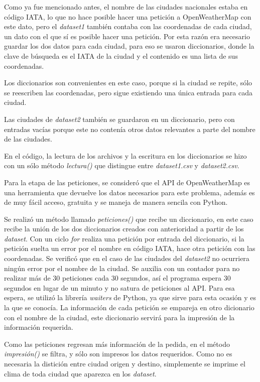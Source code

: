 \documentclass[]{article}
\begin{document}
Como ya fue mencionado antes, el nombre de las ciudades nacionales estaba 
en código IATA, lo que no hace posible hacer una petición a OpenWeatherMap 
con este dato, pero el \emph{dataset1} también contaba con las coordenadas 
de cada ciudad, un dato con el que sí es posible hacer una petición. Por esta 
razón era necesario guardar los dos datos para cada ciudad, para eso se 
usaron diccionarios, donde la clave de búsqueda es el IATA de la ciudad y el 
contenido es una lista de sus coordenadas.

Los diccionarios son convenientes en este caso, porque si la ciudad se repite, 
sólo se reescriben las coordenadas, pero sigue existiendo una única entrada 
para cada ciudad.

Las ciudades de \emph{dataset2} también se guardaron en un diccionario, 
pero con entradas vacías porque este no contenía otros datos relevantes a 
parte del nombre de las ciudades.

En el código, la lectura de los archivos y la escritura en los diccionarios se 
hizo con un sólo método \emph{lectura()} que distingue entre
\emph{dataset1.csv} y \emph{dataset2.csv}.

Para la etapa de las peticiones, se consideró que el API de OpenWeatherMap 
es una herramienta que devuelve los datos necesarios para este problema, 
además es de muy fácil acceso, gratuita y se maneja de manera sencila con 
Python.

Se realizó un método llamado \emph{peticiones()} que recibe un diccionario, 
en este caso recibe la unión de los dos diccionarios creados con anterioridad 
a partir de los \emph{dataset}. Con un ciclo \emph{for} realiza una petición 
por entrada del diccionario, si la petición suelta un error por el nombre en 
código IATA, hace otra petición con las coordenadas. Se verificó que en el 
caso de las ciudades del \emph{dataset2} no ocurriera ningún error por el 
nombre de la ciudad. Se auxilia con un contador para no realizar más de 30 
peticiones cada 30 segundos, así el programa espera 30 segundos en lugar 
de un minuto y no satura de peticiones al API. Para esa espera, se utilizó la 
librería \emph{waiters} de Python, ya que sirve para esta ocasión y es la que 
se conocía. La información de cada petición se empareja en otro dicionario 
con el nombre de la ciudad, este diccionario servirá para la impresión de la 
información requerida.

Como las peticiones regresan más información de la pedida, en el método
\emph{impresión()} se filtra, y sólo son impresos los datos requeridos. Como 
no es necesaria la distición entre ciudad origen y destino, simplemente se 
imprime el clima de toda ciudad que aparezca en los \emph{dataset}.
\end{document}
